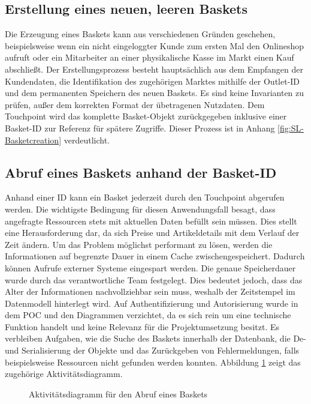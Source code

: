 \subsection{Erstellung eines neuen, leeren Baskets}

Die Erzeugung eines Baskets kann aus verschiedenen Gründen geschehen, beispielsweise wenn ein nicht eingeloggter Kunde zum ersten Mal den Onlineshop aufruft oder ein Mitarbeiter an einer physikalische Kasse im Markt einen Kauf abschließt. Der Erstellungsprozess besteht hauptsächlich aus dem Empfangen der Kundendaten, die Identifikation des zugehörigen Marktes mithilfe der Outlet-ID und dem permanenten Speichern des neuen Baskets. Es sind keine Invarianten zu prüfen, außer dem korrekten Format der übetragenen Nutzdaten. Dem Touchpoint wird das komplette Basket-Objekt zurückgegeben inklusive einer Basket-ID zur Referenz für spätere Zugriffe. Dieser Prozess ist in Anhang \ref{fig:SL-Basketcreation} verdeutlicht. 

\subsection{Abruf eines Baskets anhand der Basket-ID}

Anhand einer ID kann ein Basket jederzeit durch den Touchpoint abgerufen werden. Die wichtigste Bedingung für diesen Anwendungsfall besagt, dass angefragte Ressourcen stets mit aktuellen Daten befüllt sein müssen. Dies stellt eine Herausforderung dar, da sich Preise und Artikeldetails mit dem Verlauf der Zeit ändern. Um das Problem möglichst performant zu lösen, werden die Informationen auf begrenzte Dauer in einem Cache zwischengespeichert. Dadurch können Aufrufe externer Systeme eingespart werden. Die genaue Speicherdauer wurde durch das verantwortliche Team festgelegt. Dies bedeutet jedoch, dass das Alter der Informationen nachvollziehbar sein muss, weshalb der Zeitstempel im Datenmodell hinterlegt wird. Auf Authentifizierung und Autorisierung wurde in dem POC und den Diagrammen verzichtet, da es sich rein um eine technische Funktion handelt und keine Relevanz für die Projektumsetzung besitzt. Es verbleiben Aufgaben, wie die Suche des Baskets innerhalb der Datenbank, die De- und Serialisierung der Objekte und das Zurückgeben von Fehlermeldungen, falls beispielsweise Ressourcen nicht gefunden werden konnten. Abbildung \ref{fig:SL-Basketabruf} zeigt das zugehörige Aktivitätsdiagramm.

\begin{figure}[h!]
	\centering
	
	\caption{Aktivitätsdiagramm für den Abruf eines Baskets}
	\label{fig:SL-Basketabruf}
\end{figure}

